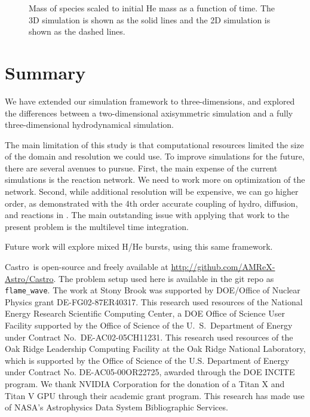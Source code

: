 \documentclass[preprint,times,tighten]{aastex631}
\newcommand{\castro}{{\sf Castro}}
\begin{document}
\begin{figure}[t]
\centering
{}
\caption{\label{fig:mass_plot} Mass of species scaled to initial He mass as a function of time.  The 3D simulation is shown as the solid lines and the 2D simulation is shown as the dashed lines.}
\end{figure}

\section{Summary}

We have extended our simulation framework to three-dimensions, and
explored the differences between a two-dimensional axisymmetric
simulation and a fully three-dimensional hydrodynamical simulation.

The main limitation of this study is that computational resources
limited the size of the domain and resolution we could use.  To
improve simulations for the future, there are several avenues to
pursue.  First, the main expense of the current simulations is the
reaction network.  We need to work more on optimization of the
network.  Second, while additional resolution will be expensive, we
can go higher order, as demonstrated with the 4th order accurate
coupling of hydro, diffusion, and reactions in \cite{castro-sdc}.  The
main outstanding issue with applying that work to the present problem
is the multilevel time integration.

Future work will explore mixed H/He bursts, using this same framework.

\begin{acknowledgements}
\castro\ is open-source and freely available at
\url{http://github.com/AMReX-Astro/Castro}.  The problem setup used
here is available in the git repo as {\tt flame\_wave}.  The work at
Stony Brook was supported by DOE/Office of Nuclear Physics grant
DE-FG02-87ER40317.  This research used resources of the National
Energy Research Scientific Computing Center, a DOE Office of Science
User Facility supported by the Office of Science of the
U.~S.\ Department of Energy under Contract No.\ DE-AC02-05CH11231.
This research used resources of the Oak Ridge Leadership Computing
Facility at the Oak Ridge National Laboratory, which is supported by
the Office of Science of the U.S. Department of Energy under Contract
No. DE-AC05-00OR22725, awarded through the DOE INCITE program.  We
thank NVIDIA Corporation for the donation of a Titan X and Titan V GPU
through their academic grant program.  This research has made use of
NASA's Astrophysics Data System Bibliographic Services.
\end{acknowledgements}
\end{document}

